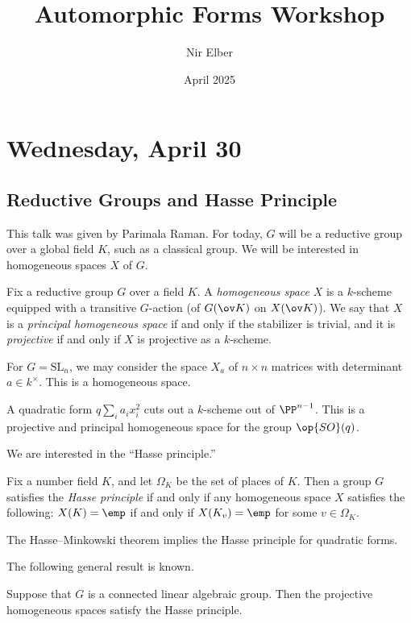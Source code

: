 \documentclass{article}
\title{Automorphic Forms Workshop}
\author{Nir Elber}
\date{April 2025}
\begin{document}
\maketitle

\tableofcontents

\section{Wednesday, April 30}

\subsection{Reductive Groups and Hasse Principle}
This talk was given by Parimala Raman. For today, $G$ will be a reductive group over a global field $K$, such as a classical group. We will be interested in homogeneous spaces $X$ of $G$.
\begin{definition}
	Fix a reductive group $G$ over a field $K$. A \textit{homogeneous space} $X$ is a $k$-scheme equipped with a transitive $G$-action (of $G(\ov K)$ on $X(\ov K)$). We say that $X$ is a \textit{principal homogeneous space} if and only if the stabilizer is trivial, and it is \textit{projective} if and only if $X$ is projective as a $k$-scheme.
\end{definition}
\begin{example}
	For $G=\mathrm{SL}_n$, we may consider the space $X_a$ of $n\times n$ matrices with determinant $a\in k^\times$. This is a homogeneous space.
\end{example}
\begin{example}
	A quadratic form $q\sum_ia_ix_i^2$ cuts out a $k$-scheme out of $\PP^{n-1}$. This is a projective and principal homogeneous space for the group $\op{SO}(q)$.
\end{example}
We are interested in the ``Hasse principle.''
\begin{definition}
	Fix a number field $K$, and let $\Omega_K$ be the set of places of $K$. Then a group $G$ satisfies the \textit{Hasse principle} if and only if any homogeneous space $X$ satisfies the following: $X(K)=\emp$ if and only if $X(K_v)=\emp$ for some $v\in\Omega_K$.
\end{definition}
\begin{example}
	The Hasse--Minkowski theorem implies the Hasse principle for quadratic forms.
\end{example}
The following general result is known.
\begin{theorem}[Harder]
	Suppose that $G$ is a connected linear algebraic group. Then the projective homogeneous spaces satisfy the Hasse principle.
\end{theorem}
\end{document}
